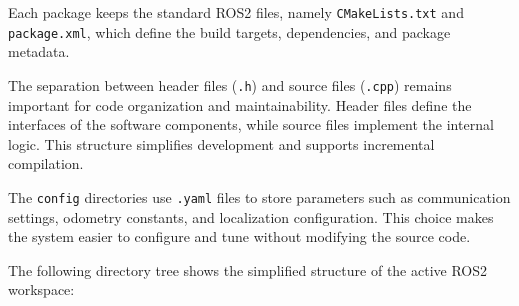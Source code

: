   Each package keeps the standard ROS2 files, namely \texttt{CMakeLists.txt} and \texttt{package.xml}, which define the build targets, dependencies, and package metadata.

  The separation between header files (\texttt{.h}) and source files
  (\texttt{.cpp}) remains important for code organization and maintainability.
  Header files define the interfaces of the software components, while source
  files implement the internal logic. This structure simplifies development and
  supports incremental compilation.

  The \texttt{config} directories use \texttt{.yaml} files to store parameters
  such as communication settings, odometry constants, and localization
  configuration. This choice makes the system easier to configure and tune without
  modifying the source code.

  The following directory tree shows the simplified structure of the active ROS2
  workspace:

